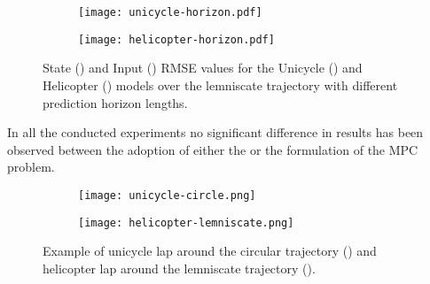 \documentclass[../main.tex]{subfiles}
\begin{document}
\begin{figure}[htb]
	\centering
    \begin{subfigure}[b]{0.49\textwidth}
        \centering
		\texttt{[image: unicycle-horizon.pdf]}
    \end{subfigure}
    \hfill
    \begin{subfigure}[b]{0.49\textwidth}
        \centering
		\texttt{[image: helicopter-horizon.pdf]}
    \end{subfigure}
	\caption{State () and Input () RMSE values for the Unicycle () and Helicopter
		() models over the lemniscate trajectory with different prediction horizon
lengths.}\label{fig:horizon}
\end{figure}

In all the conducted experiments no significant difference in results has been
observed between the adoption of either the  or the 
formulation of the MPC problem.

\begin{figure}[htb]
	\centering
    \begin{subfigure}[b]{0.40\textwidth}
        \centering
		\texttt{[image: unicycle-circle.png]}
    \end{subfigure}
    \hfill
    \begin{subfigure}[b]{0.59\textwidth}
        \centering
		\texttt{[image: helicopter-lemniscate.png]}
    \end{subfigure}
	\caption{Example of unicycle lap around the circular trajectory ()
	and helicopter lap around the lemniscate trajectory
().}\label{fig:example}
\end{figure}
\end{document}
